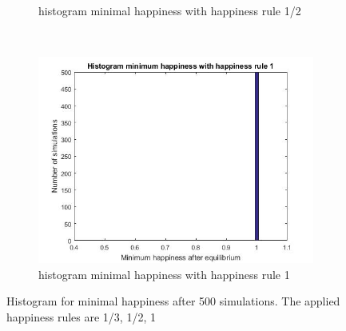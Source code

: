 \begin{figure}[H]
\begin{subfigure}{0.32\textwidth}
        \caption{histogram minimal happiness with happiness rule 1/2}
        \label{fig:tiger}
    \end{subfigure}
    ~ %
    \begin{subfigure}{0.32\textwidth}
        \includegraphics[width=\textwidth]{histogram_min_happiness_een}
        \caption{histogram minimal happiness with happiness rule 1}
        \label{minimal happiness 1}
    \end{subfigure}
    \caption{Histogram for minimal happiness after 500 simulations. The applied happiness rules are 1/3, 1/2, 1 }
\end{figure}
